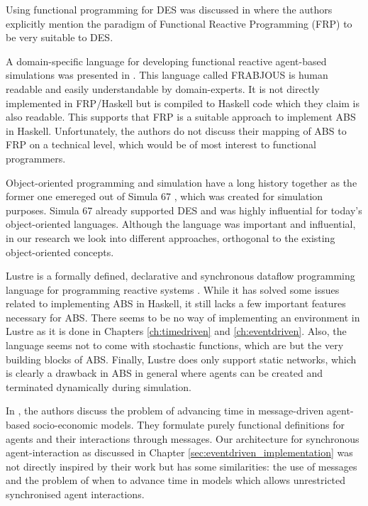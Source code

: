Using functional programming for DES was discussed in \cite{jankovic_functional_2007} where the authors explicitly mention the paradigm of Functional Reactive Programming (FRP) to be very suitable to DES.

A domain-specific language for developing functional reactive agent-based simulations was presented in \cite{schneider_towards_2012,vendrov_frabjous_2014}. This language called FRABJOUS is human readable and easily understandable by domain-experts. It is not directly implemented in FRP/Haskell but is compiled to Haskell code which they claim is also readable. This supports that FRP is a suitable approach to implement ABS in Haskell. Unfortunately, the authors do not discuss their mapping of ABS to FRP on a technical level, which would be of most interest to functional programmers.

Object-oriented programming and simulation have a long history together as the former one emereged out of Simula 67 \cite{dahl_birth_2002}, which was created for simulation purposes. Simula 67 already supported DES and was highly influential for today's object-oriented languages. Although the language was important and influential, in our research we look into different approaches, orthogonal to the existing object-oriented concepts.

Lustre is a formally defined, declarative and synchronous dataflow programming language for programming reactive systems \cite{halbwachs_synchronous_1991}. While it has solved some issues related to implementing ABS in Haskell, it still lacks a few important features necessary for ABS. There seems to be no way of implementing an environment in Lustre as it is done in Chapters \ref{ch:timedriven} and \ref{ch:eventdriven}. Also, the language seems not to come with stochastic functions, which are but the very building blocks of ABS. Finally, Lustre does only support static networks, which is clearly a drawback in ABS in general where agents can be created and terminated dynamically during simulation.

In \cite{botta_time_2010}, the authors discuss the problem of advancing time in message-driven agent-based socio-economic models. They formulate purely functional definitions for agents and their interactions through messages. Our architecture for synchronous agent-interaction as discussed in Chapter \ref{sec:eventdriven_implementation} was not directly inspired by their work but has some similarities: the use of messages and the problem of when to advance time in models which allows unrestricted synchronised agent interactions.

